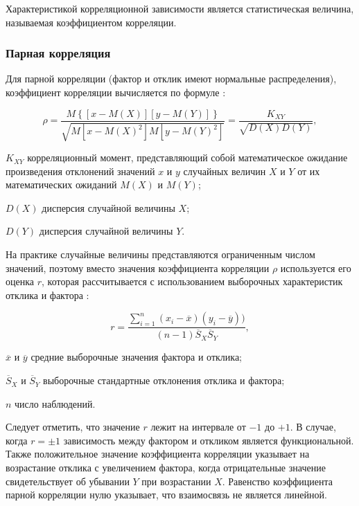 Характеристикой корреляционной зависимости является статистическая величина, называемая коэффициентом корреляции. \cite{corelMethod}

\subsubsection{Парная корреляция}

Для парной корреляции (фактор и отклик имеют нормальные распределения), коэффициент корреляции вычисляется по формуле \cite{corelMethod}:

\begin{equation}
\label{eq:corelPara}
\rho = \frac{M\left \{\left[x-M\left(X\right)\right]\left[y-M(Y)\right]\right \}}{\sqrt{M\left[x-M\left(X\right)^2\right]M\left[y-M\left(Y\right)^2\right]}} = \frac{K_{XY}}{\sqrt{D\left(X\right)D\left (Y\right)}},
\end{equation}
\begin{eqexpl}[15mm]
\item{$K_{XY}$} корреляционный момент, представляющий собой математическое ожидание произведения отклонений значений $x$ и $y$ случайных величин $X$ и $Y$ от их математических ожиданий $M(X)$ и $M(Y)$;
\item{$D(X)$} дисперсия случайной величины $X$;
\item{$D(Y)$} дисперсия случайной величины $Y$.
\end{eqexpl}

На практике случайные величины представляются ограниченным числом значений, поэтому вместо значения коэффициента корреляции $\rho$ используется его оценка $r$, которая рассчитывается с использованием выборочных характеристик отклика и фактора \cite{corelMethod}:

\begin{equation}
\label{eq:corelMark}
r = \frac{\sum_{i = 1}^{n}(x_i - \overline{x})(y_i - \overline{y}))}{(n - 1)\overline{S}_X \overline{S}_Y},
\end{equation}
\begin{eqexpl}[20mm]
\item{$\overline{x}$ и $\overline{y}$} средние выборочные значения фактора и отклика;
\item{$\overline{S}_X$ и $\overline{S}_Y$} выборочные стандартные отклонения отклика и фактора;
\item{$n$} число наблюдений.
\end{eqexpl}

Следует отметить, что значение $r$ лежит на интервале от $-1$ до $+1$. В случае, когда $r=\pm1$ зависимость между фактором и откликом является функциональной. Также положительное значение коэффициента корреляции указывает на возрастание отклика с увеличением фактора, когда отрицательные значение свидетельствует об убывании $Y$ при возрастании $X$. Равенство коэффициента парной корреляции нулю указывает, что взаимосвязь не является линейной. \cite{corelMethod}

